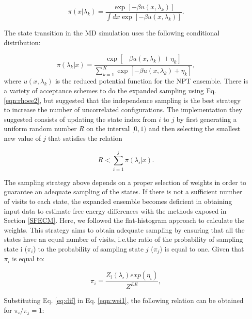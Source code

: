 \documentclass[
	12pt,				%
	openany,			%
	oneside,			%
	a4paper,			%
	english,			%
	brazil				%
	]{abntex2}
\providecommand{\DIFadd}[1]{{\protect\color{blue}\uwave{#1}}}
\providecommand{\DIFaddbegin}{}
\providecommand{\DIFaddend}{}
\providecommand{\DIFdelbegin}{}
\providecommand{\DIFdelend}{}
\providecommand{\DIFadd}[1]{{\protect\color{blue}\uwave{#1}}} %
\providecommand{\DIFaddbegin}{} %
\providecommand{\DIFaddend}{} %
\providecommand{\DIFdelbegin}{} %
\providecommand{\DIFdelend}{} %
\begin{document}
\begin{equation}
\pi(x|\lambda_{k}) = \dfrac{\exp[-\beta u(x,\lambda_{k})]}{\int dx \exp [- \beta u(x,\lambda_{k})]}.
\label{eqn:rhoee1}
\end{equation} 

The state transition in the MD simulation uses the following conditional distribution:

\begin{equation}
\pi(\lambda_{k}|x) = \dfrac{\exp[-\beta u(x,\lambda_{k}) + \eta_{k}]}{ \sum_{k=1}^{K} \exp [- \beta u(x,\lambda_{k})+ \eta_{k}]},
\label{eqn:rhoee2}
\end{equation} 
where $u(x,\lambda_{k})$ is the reduced potential function for the NPT ensemble. There is a variety of acceptance schemes to do the expanded sampling using Eq. \eqref{eqn:rhoee2}, but  suggested that the independence sampling \cite{liu2002} is the best strategy to increase the number of uncorrelated configurations. The implementation they suggested consists of updating the state index from $i$ to $j$ by first generating a uniform random number $R$ on the interval $[0,1)$ and then selecting the smallest new value of $j$ that satisfies  the relation

\begin{equation}
R < \sum_{i=1}^{j} \pi(\lambda_{i}|x) .
\label{eqn:relee2}
\end{equation} 

The sampling strategy above depends on a proper selection of weights in order to guarantee an adequate sampling of the states. If there is not a sufficient number of visits to each state, the expanded ensemble becomes deficient in obtaining input data to estimate free energy differences with the methods exposed in Section \ref{SFECM}. Here, we followed the flat-histogram approach \cite{bernd1992,bernd1993,dayal2004} to calculate the weights. This strategy aims to obtain adequate sampling by ensuring that all the states have an equal number of visits, i.e.\DIFaddbegin \DIFadd{, }\DIFaddend the ratio of the probability of sampling state i ($\pi_{i}$) to the probability of sampling state $j$ ($\pi_{j}$) is equal to one. Given that $\pi_{i}$ is equal to:

\begin{equation}
\pi_{i} = \dfrac{Z_{i}(\lambda_{i}) exp(\eta_{i})}{Z^{EE}} ,
\label{eqn:wei1}
\end{equation} 

\DIFdelbegin %
\DIFdelend Substituting Eq. \ref{eq:dif} in Eq. \ref{eqn:wei1}, the following relation can be obtained for $\pi_{i}/\pi_{j}=1$:
\end{document}

